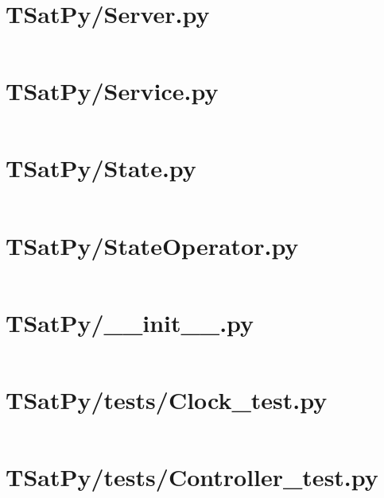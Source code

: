 \pagebreak
\section*{TSatPy/Server.py}\label{code:TSatPy/Server.py}\inputminted[linenos,fontsize=\scriptsize]{python}{/home/dcouture/git/mathyourlife/TSatPy/TSatPy/Server.py}

\pagebreak
\section*{TSatPy/Service.py}\label{code:TSatPy/Service.py}\inputminted[linenos,fontsize=\scriptsize]{python}{/home/dcouture/git/mathyourlife/TSatPy/TSatPy/Service.py}

\pagebreak
\section*{TSatPy/State.py}\label{code:TSatPy/State.py}\inputminted[linenos,fontsize=\scriptsize]{python}{/home/dcouture/git/mathyourlife/TSatPy/TSatPy/State.py}

\pagebreak
\section*{TSatPy/StateOperator.py}\label{code:TSatPy/StateOperator.py}\inputminted[linenos,fontsize=\scriptsize]{python}{/home/dcouture/git/mathyourlife/TSatPy/TSatPy/StateOperator.py}

\pagebreak
\section*{TSatPy/\_\_init\_\_.py}\label{code:TSatPy/__init__.py}\inputminted[linenos,fontsize=\scriptsize]{python}{/home/dcouture/git/mathyourlife/TSatPy/TSatPy/__init__.py}

\pagebreak
\section*{TSatPy/tests/Clock\_test.py}\label{code:TSatPy/tests/Clock_test.py}
\inputminted[linenos,fontsize=\scriptsize]{python}{/home/dcouture/git/mathyourlife/TSatPy/TSatPy/tests/Clock_test.py}

\pagebreak
\section*{TSatPy/tests/Controller\_test.py}\label{code:TSatPy/tests/Controller_test.py}
\inputminted[linenos,fontsize=\scriptsize]{python}{/home/dcouture/git/mathyourlife/TSatPy/TSatPy/tests/Controller_test.py}

